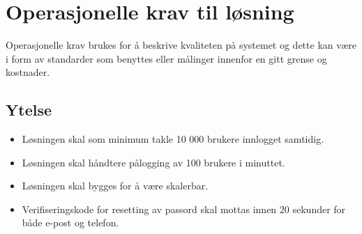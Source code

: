 \section{Operasjonelle krav til løsning}
\label{sec:kravspesifikasjon_operasjonelleKrav}
Operasjonelle krav brukes for å beskrive kvaliteten på systemet og dette kan være i form av standarder som benyttes eller målinger innenfor en gitt grense og kostnader.

\subsection{Ytelse}
\label{subsec:kravspesifikasjon_operasjonelleKrav_ytelse}
\begin{itemize}
\item Løsningen skal som minimum takle 10 000 brukere innlogget samtidig.
\item Løsningen skal håndtere pålogging av 100 brukere i minuttet.
\item Løsningen skal bygges for å være skalerbar.
\item Verifiseringskode for resetting av passord skal mottas innen 20 sekunder for både e-post og telefon.
\end{itemize}

